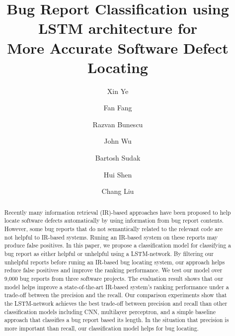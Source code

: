 \documentclass[sigconf, review, anonymous]{acmart}
\begin{document}
\title{Bug Report Classification using LSTM architecture for \\More Accurate Software Defect Locating}

\author{Xin Ye}

\author{Fan Fang}

\author{Razvan Bunescu}

\author{John Wu}

\author{Bartosh Sudak}

\author{Hui Shen}

\author{Chang Liu}

\begin{abstract}
Recently many information retrieval (IR)-based approaches have been proposed to help locate software defects automatically by using information from bug report contents. However, some bug reports that do not semantically related to the relevant code are not helpful to IR-based systems. Runing an IR-based system on these reports may produce false positives. In this paper, we propose a classification model for classifying a bug report as either helpful or unhelpful using a LSTM-network. By filtering our unhelpful reports before runing an IR-based bug locating system, our approach helps reduce false positives and improve the ranking performance. We test our model over 9,000 bug reports from three software projects. The evaluation result shows that our model helps improve a state-of-the-art IR-based system's ranking performance under a trade-off between the precision and the recall. Our comparison experiments show that the LSTM-network achieves the best trade-off between precision and recall than other classification models including CNN, multilayer perceptron, and a simple baseline approach that classifies a bug report based its length. In the situation that precision is more important than recall, our classification model helps for bug locating.
\end{abstract}
\end{document}
